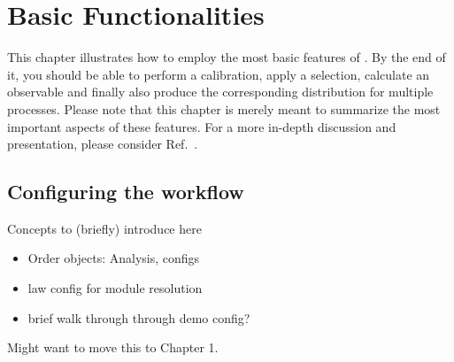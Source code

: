 \chapter{Basic Functionalities}\label{chap:basics}

This chapter illustrates how to employ the most basic features of \columnflow.
By the end of it, you should be able to perform a calibration, apply a selection, calculate an observable and finally also produce the corresponding distribution for multiple processes.
Please note that this chapter is merely meant to summarize the most important aspects of these features.
For a more in-depth discussion and presentation, please consider Ref.~\cite{cf_repo}.

\section{Configuring the workflow}\label{sec:configs}

Concepts to (briefly) introduce here
\begin{itemize}
	\item Order objects: Analysis, configs
	\item law config for module resolution
	\item brief walk through through demo config?
\end{itemize}

Might want to move this to Chapter 1.